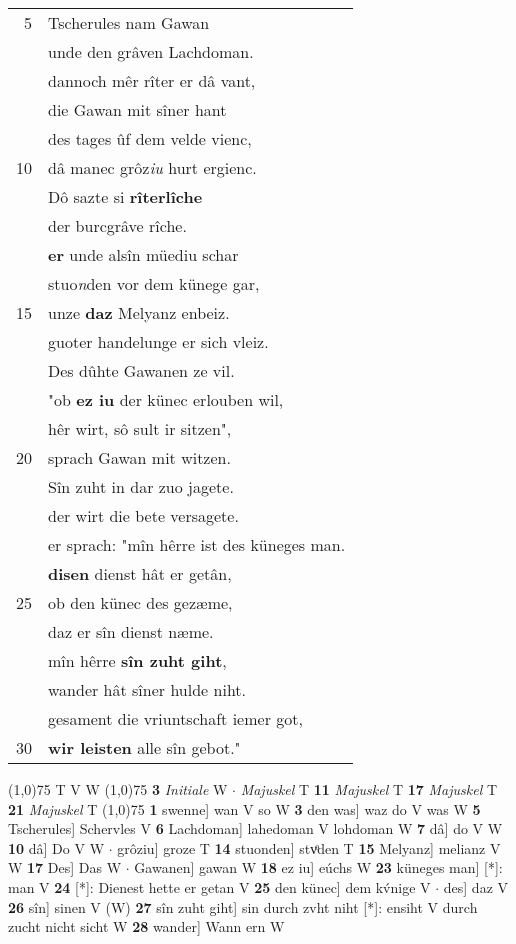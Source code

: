 \documentclass[8pt,a4paper,notitlepage]{article}
\begin{document}
\begin{table}[ht]
\begin{minipage}[t]{0.5\linewidth}
\begin{tabular}{rl}
5 & Tscherules nam Gawan\\ 
 & unde den grâven Lachdoman.\\ 
 & dannoch mêr rîter er dâ vant,\\ 
 & die Gawan mit sîner hant\\ 
 & des tages ûf dem velde vienc,\\ 
10 & dâ manec grôz\textit{iu} hurt ergienc.\\ 
 & Dô sazte si \textbf{rîterlîche}\\ 
 & der burcgrâve rîche.\\ 
 & \textbf{er} unde alsîn müediu schar\\ 
 & stuo\textit{n}den vor dem künege gar,\\ 
15 & unze \textbf{daz} Melyanz enbeiz.\\ 
 & guoter handelunge er sich vleiz.\\ 
 & Des dûhte Gawanen ze vil.\\ 
 & "ob \textbf{ez iu} der künec erlouben wil,\\ 
 & hêr wirt, sô sult ir sitzen",\\ 
20 & sprach Gawan mit witzen.\\ 
 & Sîn zuht in dar zuo jagete.\\ 
 & der wirt die bete versagete.\\ 
 & er sprach: "mîn hêrre ist des küneges man.\\ 
 & \textbf{disen} dienst hât er getân,\\ 
25 & ob den künec des gezæme,\\ 
 & daz er sîn dienst næme.\\ 
 & mîn hêrre \textbf{sîn zuht giht},\\ 
 & wander hât sîner hulde niht.\\ 
 & gesament die vriuntschaft iemer got,\\ 
30 & \textbf{wir leisten} alle sîn gebot."\\ 
\end{tabular}
\scriptsize
\line(1,0){75} \newline
T V W \newline
\line(1,0){75} \newline
\textbf{3} \textit{Initiale} W   $\cdot$ \textit{Majuskel} T  \textbf{11} \textit{Majuskel} T  \textbf{17} \textit{Majuskel} T  \textbf{21} \textit{Majuskel} T  \newline
\line(1,0){75} \newline
\textbf{1} swenne] wan V so W \textbf{3} den was] waz do V was W \textbf{5} Tscherules] Schervles V \textbf{6} Lachdoman] lahedoman V lohdoman W \textbf{7} dâ] do V W \textbf{10} dâ] Do V W  $\cdot$ grôziu] groze T \textbf{14} stuonden] stvͦden T \textbf{15} Melyanz] melianz V W \textbf{17} Des] Das W  $\cdot$ Gawanen] gawan W \textbf{18} ez iu] eúchs W \textbf{23} küneges man] [*]: man V \textbf{24} [*]: Dienest hette er getan V \textbf{25} den künec] dem kv́nige V  $\cdot$ des] daz V \textbf{26} sîn] sinen V (W) \textbf{27} sîn zuht giht] sin durch zvht niht [*]: ensiht V durch zucht nicht sicht W \textbf{28} wander] Wann ern W \newline

\end{minipage}
\end{table}
\end{document}
